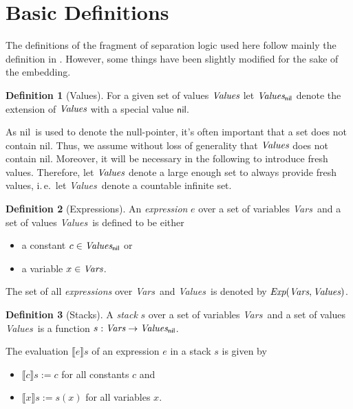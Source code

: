 \documentclass{scrartcl}
\theoremstyle{definition}
\newtheorem{definition}{Definition}
\newcommand{\nil}{{\textsf{nil}}}
\newcommand{\values}{{\emph{Values}}}
\newcommand{\valuesnil}{\ensuremath{\values_\nil}}
\newcommand{\vars}{{\emph{Vars}}}
\newcommand{\expr}{{\emph{Exp}}}
\begin{document}
\section{Basic Definitions}

The definitions of the fragment of separation logic used here follow mainly the definition in
\cite{berdine05symbolic}. However, some things have been slightly modified for the
sake of the embedding.

\begin{definition}[Values]
  For a given set of values $\values$ let $\valuesnil$
  denote the extension of $\values$ with a special value $\nil$.

  As \nil\ is used to denote the null-pointer, it's often important that a set
  does not contain \nil. Thus, we assume without loss of generality that
  $\values$ does not contain \nil. Moreover, it will be necessary in the
  following to introduce fresh values. Therefore, let $\values$ denote a large
  enough set to always provide fresh values, i.\,e.\ let \values\ denote a
  countable infinite set.
\end{definition}

\begin{definition}[Expressions]
  An \emph{expression} $e$ over a set of variables \vars\ and a set of values
  \values\ is defined to be either
\begin{itemize}
\item a constant $c \in \valuesnil$ or
\item a variable $x \in \vars$.
\end{itemize}
%
The set of all \emph{expressions} over \vars\ and \values\ is denoted by
$\expr(\vars,\values)$.
\end{definition}


\begin{definition}[Stacks]
  A \emph{stack} $s$ over a set of variables \vars\ and a set of values
  \values\ is a function $s: \vars \to \valuesnil$.

  The evaluation $\llbracket e \rrbracket s$ of an expression $e$ in a stack
  $s$ is given by
 \begin{itemize}
\item $\llbracket c \rrbracket s := c$ for all constants $c$ and
\item $\llbracket x \rrbracket s := s(x)$ for all variables $x$.
\end{itemize}
\end{definition}
\end{document}
